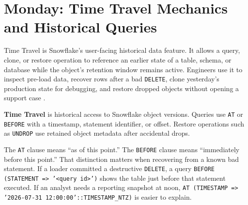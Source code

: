 \section{Monday: Time Travel Mechanics and Historical Queries}
Time Travel is Snowflake's user-facing historical data feature. It allows a query, clone, or restore operation to reference an earlier state of a table, schema, or database while the object's retention window remains active. Engineers use it to inspect pre-load data, recover rows after a bad \texttt{DELETE}, clone yesterday's production state for debugging, and restore dropped objects without opening a support case \cite{snowflakeTimeTravelDocs}.
\begin{definitionbox}
\textbf{Time Travel} is historical access to Snowflake object versions. Queries use \texttt{AT} or \texttt{BEFORE} with a timestamp, statement identifier, or offset. Restore operations such as \texttt{UNDROP} use retained object metadata after accidental drops.
\end{definitionbox}
The \texttt{AT} clause means ``as of this point.'' The \texttt{BEFORE} clause means ``immediately before this point.'' That distinction matters when recovering from a known bad statement. If a loader committed a destructive \texttt{DELETE}, a query \texttt{BEFORE (STATEMENT => '<query id>')} shows the table just before that statement executed. If an analyst needs a reporting snapshot at noon, \texttt{AT (TIMESTAMP => '2026-07-31 12:00:00'::TIMESTAMP\_NTZ)} is easier to explain.

